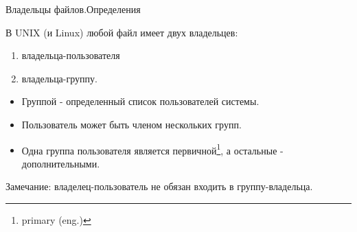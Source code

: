 \begin{frame}[fragile]{Владельцы файлов.Определения}

  В UNIX (и Linux) любой файл имеет двух владельцев:
  \begin{enumerate}
    \item владельца-пользователя
    \item владельца-группу.
  \end{enumerate} 
   
  \pause

  \begin{itemize}
    \item \alert{Группой} - определенный список пользователей системы.
    \item Пользователь может быть членом нескольких групп. 
    \item Одна группа пользователя является первичной\footnote{primary (eng.)}, а остальные - дополнительными.
  \end{itemize}
  \small{Замечание: владелец-пользователь не обязан входить в группу-владельца.}
  

\end{frame}

